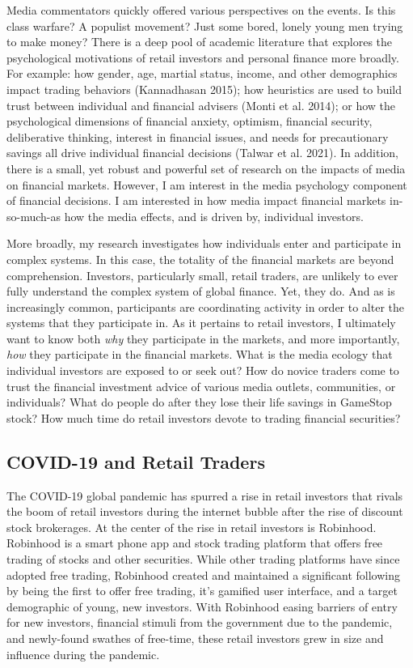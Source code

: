 \documentclass[12pt,]{article}
\begin{document}
Media commentators quickly offered various perspectives on the events.
Is this class warfare? A populist movement? Just some bored, lonely
young men trying to make money? There is a deep pool of academic
literature that explores the psychological motivations of retail
investors and personal finance more broadly. For example: how gender,
age, martial status, income, and other demographics impact trading
behaviors (Kannadhasan 2015); how heuristics are used to build trust
between individual and financial advisers (Monti et al. 2014); or how
the psychological dimensions of financial anxiety, optimism, financial
security, deliberative thinking, interest in financial issues, and needs
for precautionary savings all drive individual financial decisions
(Talwar et al. 2021). In addition, there is a small, yet robust and
powerful set of research on the impacts of media on financial markets.
However, I am interest in the media psychology component of financial
decisions. I am interested in how media impact financial markets
in-so-much-as how the media effects, and is driven by, individual
investors.

More broadly, my research investigates how individuals enter and
participate in complex systems. In this case, the totality of the
financial markets are beyond comprehension. Investors, particularly
small, retail traders, are unlikely to ever fully understand the complex
system of global finance. Yet, they do. And as is increasingly common,
participants are coordinating activity in order to alter the systems
that they participate in. As it pertains to retail investors, I
ultimately want to know both \emph{why} they participate in the markets,
and more importantly, \emph{how} they participate in the financial
markets. What is the media ecology that individual investors are exposed
to or seek out? How do novice traders come to trust the financial
investment advice of various media outlets, communities, or individuals?
What do people do after they lose their life savings in GameStop stock?
How much time do retail investors devote to trading financial
securities?

\hypertarget{covid-19-and-retail-traders}{%
\subsection{COVID-19 and Retail
Traders}\label{covid-19-and-retail-traders}}

The COVID-19 global pandemic has spurred a rise in retail investors that
rivals the boom of retail investors during the internet bubble after the
rise of discount stock brokerages. At the center of the rise in retail
investors is Robinhood. Robinhood is a smart phone app and stock trading
platform that offers free trading of stocks and other securities. While
other trading platforms have since adopted free trading, Robinhood
created and maintained a significant following by being the first to
offer free trading, it's gamified user interface, and a target
demographic of young, new investors. With Robinhood easing barriers of
entry for new investors, financial stimuli from the government due to
the pandemic, and newly-found swathes of free-time, these retail
investors grew in size and influence during the pandemic.
\end{document}
